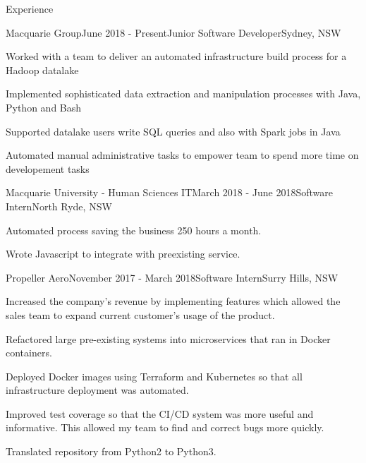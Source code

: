 \documentclass{resume} %
\begin{document}

\begin{rSection}{Experience}


    \begin{rSubsection}{Macquarie Group}{June 2018 - Present}{Junior Software Developer}{Sydney, NSW}
    \item Worked with a team to deliver an automated infrastructure build process for a Hadoop datalake
    \item Implemented sophisticated data extraction and manipulation processes with Java, Python and Bash
    \item Supported datalake users write SQL queries and also with Spark jobs in Java
    \item Automated manual administrative tasks to empower team to spend more time on developement tasks
    \end{rSubsection}
    
    \begin{rSubsection}{Macquarie University - Human Sciences IT}{March 2018 - June 2018}{Software Intern}{North Ryde, NSW}
    \item Automated process saving the business 250 hours a month.
    \item Wrote Javascript to integrate with preexisting service.
    \end{rSubsection}
    
    \begin{rSubsection}{Propeller Aero}{November 2017 - March 2018}{Software Intern}{Surry Hills, NSW}
    \item Increased the company's revenue by implementing features which allowed the sales team to expand current customer's usage of the product.
    \item Refactored large pre-existing systems into microservices that ran in Docker containers. 
    \item Deployed Docker images using Terraform and Kubernetes so that all infrastructure deployment was automated.
    \item Improved test coverage so that the CI/CD system was more useful and informative. This allowed my team to find and correct bugs more quickly.
    \item Translated repository from Python2 to Python3.
    \end{rSubsection}
    
    \end{rSection}
    
\end{document}
